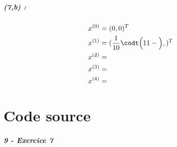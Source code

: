 \documentclass[11pt,a4paper]{report}
\begin{document}
\paragraph*{(7,b) : }
\begin{align*}
& x^{(0)} = (0,0)^T \\
& x^{(1)} = (\frac{1}{10} \codt \Big( 11 -  \Big),)^T \\
& x^{(2)} =  \\
& x^{(3)} =  \\
& x^{(4)} =  \\
\end{align*}

\chapter{Code source}

\paragraph{9 - Exercice 7}
\end{document}
